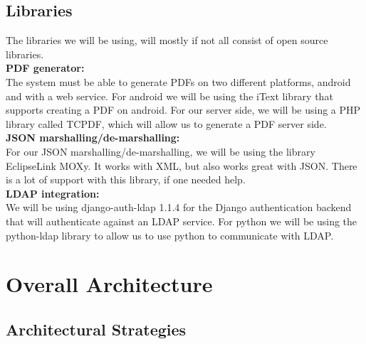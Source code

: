 \documentclass[12pt]{article}
\begin{document}
	\subsection{Libraries}
	The libraries we will be using, will mostly if not all consist of open source libraries.
	\\\linebreak
	\textbf{PDF generator:}
	\\\linebreak
	The system must be able to generate PDFs on two different platforms, android and with a web service. 		For android we will be using the iText library that supports creating a PDF on android. For our server 	side, we will be using a PHP library called TCPDF, which will allow us to generate a PDF server side.
	\\\linebreak
	\textbf{JSON marshalling/de-marshalling:}
	\\\linebreak
	For our JSON marshalling/de-marshalling, we will be using the library EclipseLink MOXy. It works with 		XML, but also works great with JSON. There is a lot of support with this library, if one needed help.
	\\\linebreak
	\textbf{LDAP integration:}
	\\\linebreak
	We will be using django-auth-ldap 1.1.4 for the Django authentication backend that will authenticate 		against an LDAP service. For python we will be using the python-ldap library to allow us to use python 	to communicate with LDAP.


\section{Overall Architecture}



	\subsection{Architectural Strategies}
	
	
\end{document}
